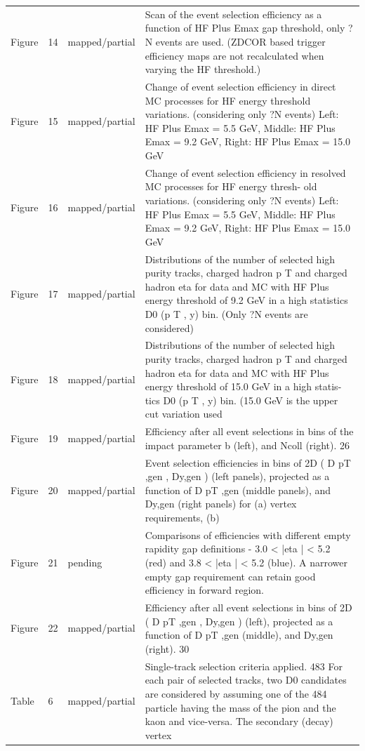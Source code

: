 \documentclass[11pt]{article}
\begin{document}
\begin{longtable}{lll p{}}
Figure & 14 & mapped/partial & Scan of the event selection efficiency as a function of HF Plus Emax gap threshold, only ?N events are used. (ZDCOR based trigger efficiency maps are not recalculated when varying the HF threshold.) \\
Figure & 15 & mapped/partial & Change of event selection efficiency in direct MC processes for HF energy threshold variations. (considering only ?N events) Left: HF Plus Emax = 5.5 GeV, Middle: HF Plus Emax = 9.2 GeV, Right: HF Plus Emax = 15.0 GeV \\
Figure & 16 & mapped/partial & Change of event selection efficiency in resolved MC processes for HF energy thresh- old variations. (considering only ?N events) Left: HF Plus Emax = 5.5 GeV, Middle: HF Plus Emax = 9.2 GeV, Right: HF Plus Emax = 15.0 GeV \\
Figure & 17 & mapped/partial & Distributions of the number of selected high purity tracks, charged hadron p T and charged hadron eta for data and MC with HF Plus energy threshold of 9.2 GeV in a high statistics D0 (p T , y) bin. (Only ?N events are considered) \\
Figure & 18 & mapped/partial & Distributions of the number of selected high purity tracks, charged hadron p T and charged hadron eta for data and MC with HF Plus energy threshold of 15.0 GeV in a high statis- tics D0 (p T , y) bin. (15.0 GeV is the upper cut variation used \\
Figure & 19 & mapped/partial & Efficiency after all event selections in bins of the impact parameter b (left), and Ncoll (right). 26 \\
Figure & 20 & mapped/partial & Event selection efficiencies in bins of 2D ( D pT ,gen , Dy,gen ) (left panels), projected as a function of D pT ,gen (middle panels), and Dy,gen (right panels) for (a) vertex requirements, (b) \\
Figure & 21 & pending & Comparisons of efficiencies with different empty rapidity gap definitions - 3.0 < |eta | < 5.2 (red) and 3.8 < |eta | < 5.2 (blue). A narrower empty gap requirement can retain good efficiency in forward region. \\
Figure & 22 & mapped/partial & Efficiency after all event selections in bins of 2D ( D pT ,gen , Dy,gen ) (left), projected as a function of D pT ,gen (middle), and Dy,gen (right). 30 \\
Table & 6 & mapped/partial & Single-track selection criteria applied. 483 For each pair of selected tracks, two D0 candidates are considered by assuming one of the 484 particle having the mass of the pion and the kaon and vice-versa. The secondary (decay) vertex \\

\end{longtable}
\end{document}
